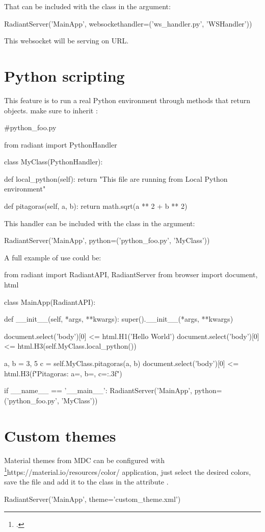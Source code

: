 That can be included with the  class in the  argument:
\begin{python}
RadiantServer('MainApp', websockethandler=('ws_handler.py', 'WSHandler'))
\end{python}

This websocket will be serving on  URL.

\section{Python scripting}
This feature is to run a real Python environment through methods that return objects. make sure to inherit :
\begin{python}
#python_foo.py

from radiant import PythonHandler

class MyClass(PythonHandler):

    def local_python(self):
        return "This file are running from Local Python environment"

    def pitagoras(self, a, b):
        return math.sqrt(a ** 2 + b ** 2)
\end{python}
This handler can be included with the  class in the  argument:
\begin{python}
RadiantServer('MainApp', python=('python_foo.py', 'MyClass'))
\end{python}
A full example of use could be:
\begin{python}
from radiant import RadiantAPI, RadiantServer
from browser import document, html

class MainApp(RadiantAPI):

    def __init__(self, *args, **kwargs):
        super().__init__(*args, **kwargs)

        document.select('body')[0] <= html.H1('Hello World')
        document.select('body')[0] <= html.H3(self.MyClass.local_python())

        a, b = 3, 5
        c = self.MyClass.pitagoras(a, b)
        document.select('body')[0] <= html.H3(f"Pitagoras: {a=}, {b=}, {c=:.3f}")

if __name__ == '__main__':
    RadiantServer('MainApp', python=('python_foo.py', 'MyClass'))
\end{python}


\section{Custom themes}
Material themes from MDC can be configured with \footcite{Color Tool}{https://material.io/resources/color/} application, just select the desired colors, save the file and add it to the  class in the attribute .
\begin{python}
RadiantServer('MainApp', theme='custom_theme.xml')
\end{python}
